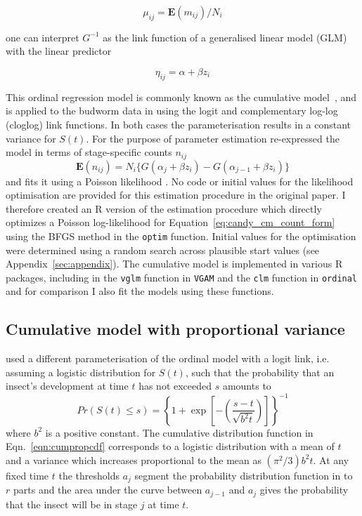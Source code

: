 $$\mu_{ij} = \mathbf{E}(m_{ij})/N_i$$

 one can interpret $G^{-1}$ as the link function of a generalised linear model (GLM) with the linear predictor 

$$\eta_{ij}=\alpha+\beta z_i$$

This ordinal regression model is commonly known as the cumulative model~\citep{burkner2019ordinal}, and is applied to the budworm data in \citep{candy1991modeling} using the logit and complementary log-log (cloglog) link functions. 
In both cases the parameterisation results in a constant variance for $S(t)$.
For the purpose of parameter estimation \citet{candy1991modeling} re-expressed the model in terms of stage-specific counts $n_{ij}$  
\begin{equation}
\mathbf{E}(n_{ij})=N_i\{G(\alpha_j + \beta z_i) - G(\alpha_{j-1} + \beta z_i)\}
\label{eq:candy_cm_count_form}
\end{equation}
and fits it using a Poisson likelihood \citep{thompson1981composite}. 
No code or initial values for the likelihood optimisation are provided for this estimation procedure in the original paper.   
I therefore created an R version of the estimation procedure which directly optimizes a Poisson log-likelihood for Equation~\ref{eq:candy_cm_count_form} using the BFGS method in the \verb+optim+ function.
Initial values for the optimisation were determined using a random search across plausible start values (see Appendix~\ref{sec:appendix}).
 The cumulative model is implemented in various R packages, including in the \verb+vglm+ function in \verb+VGAM+ \citep{VGAM} and the \verb+clm+ function in \verb+ordinal+ \cite{ordinal} and for comparison I also fit the models using these functions.

\subsection{Cumulative model with proportional variance}
\citet{dennis1986stochastic} used a different parameterisation of the ordinal model with a logit link, i.e. assuming a logistic distribution for $S(t)$, such that the probability that an insect's development at time $t$ has not exceeded $s$ amounts to 
\begin{equation}
Pr(S(t) \leq s) = \left\{ 1 + \exp\left[-\left(\frac{s-t}{\sqrt{b^2t}}\right)\right]\right\}^{-1}
\label{eqn:cumpropcdf}
\end{equation}
where $b^2$ is a positive constant. 
The cumulative distribution function in Eqn.~\ref{eqn:cumpropcdf} corresponds to a logistic distribution with a mean of $t$ and a variance which increases proportional to the mean as $(\pi^2/3)b^2t$.
At any fixed time $t$ the thresholds $a_j$ segment the probability distribution function in to $r$ parts and the area under the curve between $a_{j-1}$ and $a_j$ gives the probability that the insect will be in stage $j$ at time $t$.

